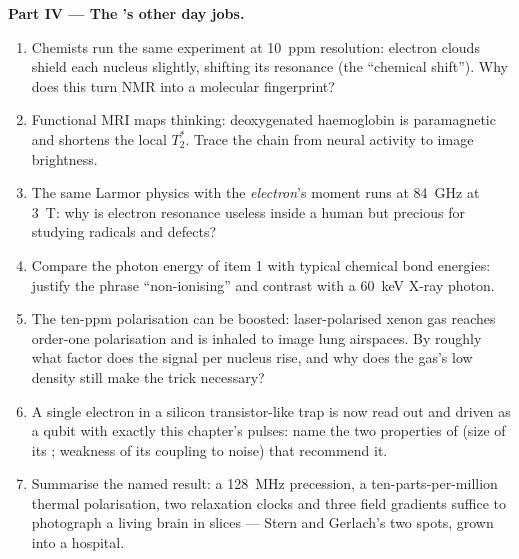 \begin{problem}
\medskip\noindent\textbf{Part IV --- The 's other day jobs.}
\begin{enumerate}[resume]
  \item Chemists run the same experiment at \qty{10}{ppm}
        resolution: electron clouds shield each nucleus slightly,
        shifting its resonance (the ``chemical shift''). Why does
        this turn NMR into a molecular fingerprint?
  \item Functional MRI maps thinking: deoxygenated haemoglobin is
        paramagnetic and shortens the local $T_2^*$. Trace the
        chain from neural activity to image brightness.
  \item The same Larmor physics with the \emph{electron}'s moment
        runs at \qty{84}{GHz} at \qty{3}{T}: why is electron
        resonance useless inside a human but precious for studying
        radicals and defects?
  \item Compare the photon energy of item 1 with typical chemical
        bond energies: justify the phrase ``non-ionising'' and
        contrast with a \qty{60}{keV} X-ray photon.
  \item The ten-ppm polarisation can be boosted: laser-polarised
        xenon gas reaches order-one polarisation and is inhaled to
        image lung airspaces. By roughly what factor does the
        signal per nucleus rise, and why does the gas's low density
        still make the trick necessary?
  \item A single electron  in a silicon transistor-like trap
        is now read out and driven as a qubit with exactly this
        chapter's pulses: name the two properties of  (size of
        its ; weakness of its coupling to noise) that
        recommend it.
  \item Summarise the named result: a \qty{128}{MHz} 
        precession, a ten-parts-per-million thermal polarisation,
        two relaxation clocks and three field gradients suffice to
        photograph a living brain in slices --- Stern and Gerlach's
        two spots, grown into a hospital.
\end{enumerate}
\end{problem}
